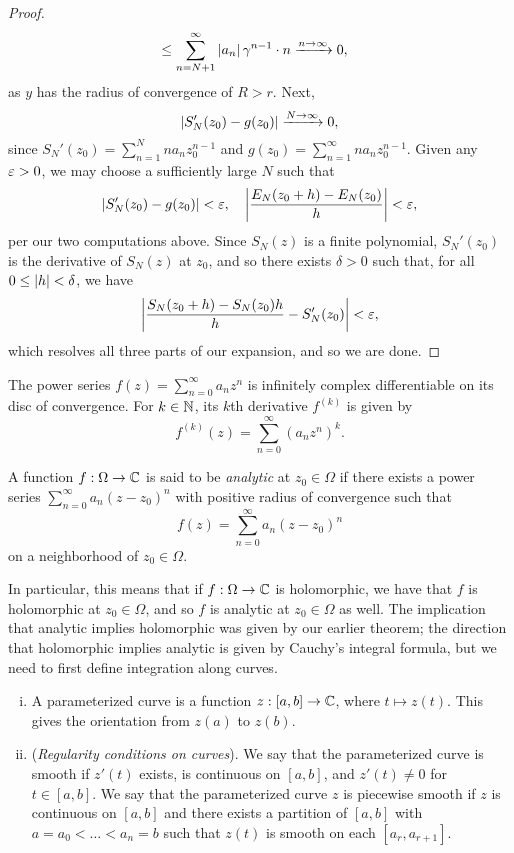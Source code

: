 \begin{proof}
\begin{align*}
        &\leq \sum_{n=N+1}^\infty \left\lvert a_n \right\rvert \gamma^{n-1} \cdot n \xrightarrow{n \to \infty} 0,
    \end{align*}
    as $y$ has the radius of convergence of $R > r$. Next,
    \[ \left\lvert S_N'(z_0) - g(z_0) \right\rvert \xrightarrow{N \to \infty} 0, \]
    since $S_N'(z_0) = \sum_{n=1}^N n a_n z_0^{n-1}$ and $g(z_0) = \sum_{n=1}^\infty n a_n z_0^{n-1}$. Given any $\varepsilon > 0$, we may choose a sufficiently large $N$ such that
    \[ \left\lvert S_N'(z_0) - g(z_0) \right\rvert < \varepsilon, \quad \left\lvert \frac{E_N(z_0 + h) - E_N(z_0)}{h} \right\rvert < \varepsilon, \]
    per our two computations above. Since $S_N(z)$ is a finite polynomial, $S_N'(z_0)$ is the derivative of $S_N(z)$ at $z_0$, and so there exists $\delta > 0$ such that, for all $0 \leq \left\lvert h \right\rvert < \delta$, we have
    \[ \left\lvert \frac{S_N(z_0 + h) - S_N(z_0){h}}{h} - S_N'(z_0) \right\rvert < \varepsilon, \]
    which resolves all three parts of our expansion, and so we are done.
\end{proof}
\begin{corollary}
    The power series $f(z) = \sum_{n=0}^\infty a_n z^n$ is infinitely complex differentiable on its disc of convergence. For $k \in \mathbb N$, its $k$th derivative $f^{(k)}$ is given by
    \[ f^{(k)}(z) = \sum_{n=0}^\infty (a_n z^n)^k. \]
\end{corollary}
\begin{definition}
    A function $f : \Omega \to \mathbb C$ is said to be \textit{analytic} at $z_0 \in \Omega$ if there exists a power series $\sum_{n=0}^\infty a_n (z - z_0)^n$ with positive radius of convergence such that
    \[ f(z) = \sum_{n=0}^\infty a_n (z - z_0)^n \]
    on a neighborhood of $z_0 \in \Omega$.
\end{definition}
\noindent In particular, this means that if $f : \Omega \to \mathbb C$ is holomorphic, we have that $f$ is holomorphic at $z_0 \in \Omega$, and so $f$ is analytic at $z_0 \in \Omega$ as well. The implication that analytic implies holomorphic was given by our earlier theorem; the direction that holomorphic implies analytic is given by Cauchy's integral formula, but we need to first define integration along curves.
\begin{enumerate}[(i)]
    \item A parameterized curve is a function $z : [a, b] \to \mathbb C$, where $t \mapsto z(t)$. This gives the orientation from $z(a)$ to $z(b)$.
    \item (\textit{Regularity conditions on curves}). We say that the parameterized curve is smooth if $z'(t)$ exists, is continuous on $[a, b]$, and $z'(t) \neq 0$ for $t \in [a, b]$. We say that the parameterized curve $z$ is piecewise smooth if $z$ is continuous on $[a, b]$ and there exists a partition of $[a, b]$ with $a = a_0 < \dots < a_n = b$ such that $z(t)$ is smooth on each $[a_r, a_{r+1}]$.
\end{enumerate}